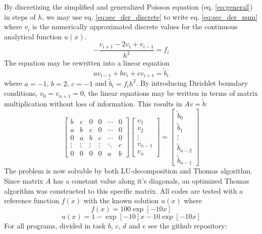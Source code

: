 \documentclass[twoside,twocolumn]{article}
\begin{document}
By discretizing the simplified and generalized Poisson equation (eq. \ref{eq:general}) in steps of $h$, we may use eq. \ref{eq:sec_der_discrete} to write eq. \ref{eq:sec_der_num} where $v_i$ is the numerically approximated discrete values for the continuous analytical function $u(x)$.
\begin{equation}
-\frac{v_{i+1}-2v_i+v_{i-1}}{h^2}=f_i \label{eq:sec_der_num}
\end{equation}
The equation may be rewritten into a linear equation
\begin{equation*}
av_{i-1}+bv_i+cv_{i+1}=\tilde{b}_i 
\end{equation*}
where $a=-1$, $b=2$, $c=-1$ and $\tilde{b}_i=f_ih^2$. By introducing Dirichlet boundary conditions, $v_0=v_{n+1}=0$, the linear equations may be written in terms of matrix multiplication without loss of information. This results in $Av=\tilde{b}$:
\begin{equation}
\begin{bmatrix}
b&c&0&0&\cdots &0\\
a&b&c&0& \cdots & 0\\
0&a&b&c& \cdots & 0\\
\vdots&\vdots&\vdots&\vdots&\ddots&c\\
0&0&0&0&a&b
\end{bmatrix}
\begin{bmatrix}
v_1\\v_2\\\vdots\\v_{n-1}\\v_{n}
\end{bmatrix}=
\begin{bmatrix}
\tilde{b}_0\\\tilde{b}_1\\\vdots\\\tilde{b}_{n-2}\\\tilde{b}_{n-1}
\end{bmatrix} \label{eq:problem}
\end{equation}
The problem is now solvable by both LU-decomposition and Thomas algorithm. Since matrix $A$ has a constant value along it's diagonals, an optimized Thomas algorithm was constructed to this specific matrix. All codes are tested with a reference function $f(x)$ with the known solution $u(x)$ where
\begin{equation*}
f(x)=100\exp[-10x]
\end{equation*}
\begin{equation*}
u(x)=1-\exp[-10]x-10\exp[-10x]
\end{equation*}
For all programs, divided in task $b$, $c$, $d$ and $e$ see the github repository: 
\end{document}
